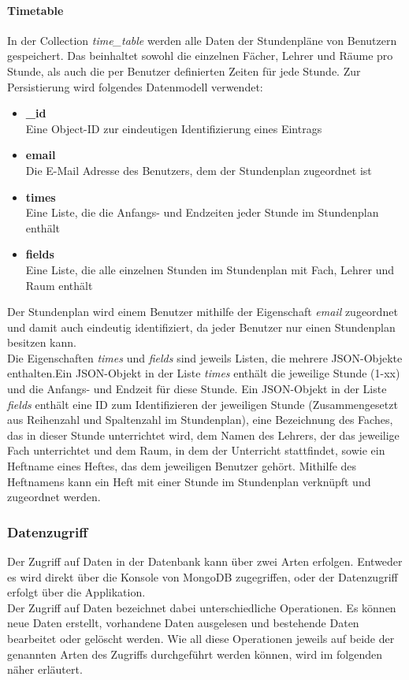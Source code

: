 \paragraph{Timetable}
In der Collection \textit{time\_table} werden alle Daten der Stundenpläne von Benutzern gespeichert. Das beinhaltet sowohl die einzelnen Fächer, Lehrer und Räume pro Stunde, als auch die per Benutzer definierten Zeiten für jede Stunde. Zur Persistierung wird folgendes Datenmodell verwendet:
\begin{itemize}
\item \textbf{\_id}\\ Eine Object-ID zur eindeutigen Identifizierung eines Eintrags
\item \textbf{email}\\ Die E-Mail Adresse des Benutzers, dem der Stundenplan zugeordnet ist
\item \textbf{times}\\ Eine Liste, die die Anfangs- und Endzeiten jeder Stunde im Stundenplan enthält
\item \textbf{fields}\\ Eine Liste, die alle einzelnen Stunden im Stundenplan mit Fach, Lehrer und Raum enthält
\end{itemize}
Der Stundenplan wird einem Benutzer mithilfe der Eigenschaft \textit{email} zugeordnet und damit auch eindeutig identifiziert, da jeder Benutzer nur einen Stundenplan besitzen kann. \\
Die Eigenschaften \textit{times} und \textit{fields} sind jeweils Listen, die mehrere JSON-Objekte enthalten.Ein JSON-Objekt in der Liste \textit{times} enthält die jeweilige Stunde (1-xx) und die Anfangs- und Endzeit für diese Stunde. Ein JSON-Objekt in der Liste \textit{fields} enthält eine ID zum Identifizieren der jeweiligen Stunde (Zusammengesetzt aus Reihenzahl und Spaltenzahl im Stundenplan), eine Bezeichnung des Faches, das in dieser Stunde unterrichtet wird, dem Namen des Lehrers, der das jeweilige Fach unterrichtet und dem Raum, in dem der Unterricht stattfindet, sowie ein Heftname eines Heftes, das dem jeweiligen Benutzer gehört. Mithilfe des Heftnamens kann ein Heft mit einer Stunde im Stundenplan verknüpft und zugeordnet werden.

\subsubsection{Datenzugriff}
Der Zugriff auf Daten in der Datenbank kann über zwei Arten erfolgen. Entweder es wird direkt über die Konsole von MongoDB zugegriffen, oder der Datenzugriff erfolgt über die Applikation. \\
Der Zugriff auf Daten bezeichnet dabei unterschiedliche Operationen. Es können neue Daten erstellt, vorhandene Daten ausgelesen und bestehende Daten bearbeitet oder gelöscht werden. Wie all diese Operationen jeweils auf beide der genannten Arten des Zugriffs durchgeführt werden können, wird im folgenden näher erläutert.
